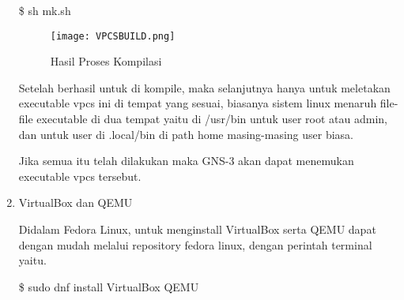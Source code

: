 \documentclass[12pt, a4paper]{article}
\begin{document}
\begin{enumerate}[label=\arabic*.]
          \$ sh mk.sh

          \begin{figure}[h]
              \centering
              \texttt{[image: VPCSBUILD.png]}
              \caption{\small{Hasil Proses Kompilasi}}
          \end{figure}

          Setelah berhasil untuk di kompile, maka selanjutnya hanya untuk
          meletakan executable vpcs ini di tempat yang sesuai, biasanya
          sistem linux menaruh file-file executable di dua tempat yaitu
          di /usr/bin untuk user root atau admin, dan untuk user di
          .local/bin di path home masing-masing user biasa.

          Jika semua itu telah dilakukan maka GNS-3 akan dapat menemukan executable
          vpcs tersebut.

        \item VirtualBox dan QEMU

          Didalam Fedora Linux, untuk menginstall VirtualBox serta QEMU dapat dengan 
          mudah melalui repository fedora linux, dengan perintah terminal yaitu.

          \$ sudo dnf install VirtualBox QEMU

      \end{enumerate}
\end{document}
